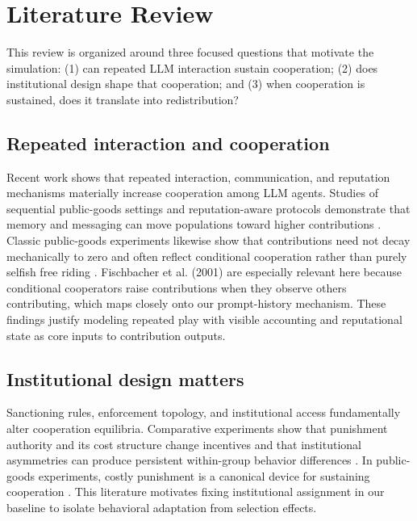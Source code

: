 \documentclass[12pt,letterpaper]{report}
\begin{document}
\chapter{Literature Review}

This review is organized around three focused questions that motivate the simulation: (1) can repeated LLM interaction sustain cooperation; (2) does institutional design shape that cooperation; and (3) when cooperation is sustained, does it translate into redistribution?

\section{Repeated interaction and cooperation}
Recent work shows that repeated interaction, communication, and reputation mechanisms materially increase cooperation among LLM agents. Studies of sequential public-goods settings and reputation-aware protocols demonstrate that memory and messaging can move populations toward higher contributions \citep{piatti2024,liang2025,ren2025}. Classic public-goods experiments likewise show that contributions need not decay mechanically to zero and often reflect conditional cooperation rather than purely selfish free riding \citep{andreoni1988,fischbacher2001}. Fischbacher et al. (2001) are especially relevant here because conditional cooperators raise contributions when they observe others contributing, which maps closely onto our prompt-history mechanism. These findings justify modeling repeated play with visible accounting and reputational state as core inputs to contribution outputs.

\section{Institutional design matters}
Sanctioning rules, enforcement topology, and institutional access fundamentally alter cooperation equilibria. Comparative experiments show that punishment authority and its cost structure change incentives and that institutional asymmetries can produce persistent within-group behavior differences \citep{warnakulasuriya2026,decurto2025,vezhnevets2023}. In public-goods experiments, costly punishment is a canonical device for sustaining cooperation \citep{fehrgachter2000,fehrgachter2002}. This literature motivates fixing institutional assignment in our baseline to isolate behavioral adaptation from selection effects.
\end{document}
